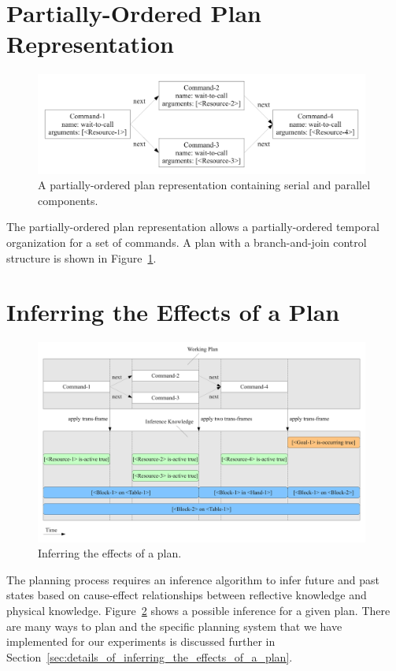 \section{Partially-Ordered Plan Representation}

\begin{figure}[bth]
  \center
  \includegraphics[width=11cm]{gfx/serial_and_parallel_plan}
  \caption[A partially-ordered plan with serial and parallel
    components.]{A partially-ordered plan representation containing
    serial and parallel components.}
  \label{fig:serial_and_parallel_plan}
\end{figure}

The partially-ordered plan representation allows a partially-ordered
temporal organization for a set of commands.  A plan with a
branch-and-join control structure is shown in
Figure~\ref{fig:serial_and_parallel_plan}.


\section{Inferring the Effects of a Plan}
\label{sec:inferring_the_effects_of_a_plan}

\begin{figure}[bth]
  \center
  \includegraphics[width=11cm]{gfx/infer_plan_effects}
  \caption[Inferring the effects of a plan.]{Inferring the effects of
    a plan.}
  \label{fig:infer_plan_effects}
\end{figure}

The planning process requires an inference algorithm to infer future
and past states based on cause-effect relationships between reflective
knowledge and physical knowledge.  Figure~\ref{fig:infer_plan_effects}
shows a possible inference for a given plan.  There are many ways to
plan and the specific planning system that we have implemented for our
experiments is discussed further in
Section~\ref{sec:details_of_inferring_the_effects_of_a_plan}.


